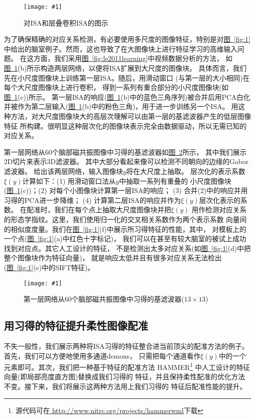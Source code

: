 \documentclass[a4paper]{article}
\newcommand{\addplot}[1]{\centering
	\texttt{[image: \#1]}}
\numberwithin{equation}{section}
\newcommand{\figref}[1]{\hyperref[fig:#1]{\figurename~\ref*{fig:#1}}}
\renewcommand{\figurename}{图}
\begin{document}
\begin{figure}
    \addplot{res/fig2.png}
    \caption{对ISA和层叠卷积ISA的图示}
    \label{fig:2}
\end{figure}

为了确保精确的对应关系检测，有必要使用多尺度的图像特征，特别是对\figref{1}
中给出的脑室例子。然而，这也导致了在大图像块上进行特征学习的高维输入问题。
在这方面，我们采用\figref{le2011learning}中视频数据分析的方法，
如\figref{2}(b)所示构造两层网络，以便将ISA扩展到大尺度的图像块。
具体而言，我们先在小尺度图像块上训练第一层ISA。随后，用滑动窗口
(与第一层的大小相同)在每个大尺度图像块上进行卷积，
得到一系列有重合部分的小尺度图像块(如\figref{2}(c))所示。
第一层ISA的响应(\figref{2}(b)中的蓝色三角序列)被合并后用PCA白化
并被作为第二层输入(\figref{2}(b)中的粉色三角)，用于进一步训练另一个ISA。
用这种方法，对大尺度图像块大的高层次理解可以由第一层的基滤波器产生的低层图像特征
所构建。很明显这种层次化的图像块表示完全由数据驱动，所以无需已知的对应关系。

第一层网络从60个脑部磁共振图像中习得的基滤波器如\figref{3}所示，
其中我们展示2D切片来表示3D滤波器。
其中大部分看起来像可以检测不同朝向的边缘的Gabor滤波器。
给出该两层网络，输入图像块$y$将在大尺度上抽取。
层次化的表示系数$\xi(y)$计算如下：(1) 用滑动窗口法从$y$中抽取一系列有重叠的
小尺度图像块(\figref{2}(c))；(2) 对每个小图像块计算第一层ISA的响应；
(3) 合并(2)中的响应并用习得的PCA进一步降维；
(4) 计算第二层ISA的响应并作为$\xi(y)$层次化表示的系数。
在配准时，我们在每个点上抽取大尺度图像块并把$\xi(y)$
用作检测对应关系的形态学指纹。这里，我们使用归一化的交叉相关系数作为两个表示系数
向量间的相似度度量。我们在\figref{1}(f)中展示所习得特征的性能，其中，
对模板上的一个点(\figref{1}(a)中红色十字标记)，
我们可以在甚至有较大脑室的被试上成功找到对应点。其它人工设计的特征，
不是检测出太多对应关系(如\figref{1}(d)中把整个图像块作为特征向量)，
就是响应太低并且有很多对应关系无法检出(\figref{1}(e)中的SIFT特征)。


\begin{figure}
    \addplot{res/fig3.png}
    \caption{第一层网络从60个脑部磁共振图像中习得的基滤波器($13\times 13$)}
    \label{fig:3}
\end{figure}



\subsection{用习得的特征提升柔性图像配准}
不失一般性，我们展示两种将ISA习得的特征整合进当前顶尖的配准方法的例子。
首先，我们可以方便地使用多通道demons\cite{peyrat2008registration}，
只需把每个通道看作$\xi(y)$中的一个元素即可。其次，我们把一种基于特征的配准方法
HAMMER\cite{shen2007image}\footnote{源代码可在\url{
http://www.nitrc.org/projects/hammerwml}下载}
中人工设计的特征向量(即局部亮度直方图)替换成我们习得的
特征，并且保持柔性配准的优化方法不变。接下来，我们将展示这两种方法用上我们习得的
特征后配准性能的提升。
\end{document}
